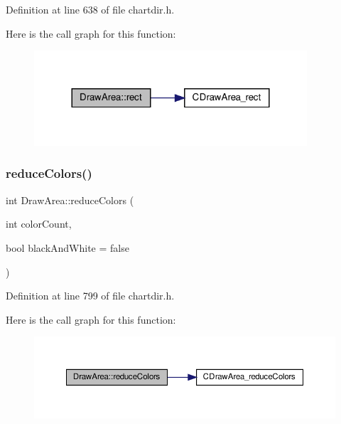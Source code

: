 Definition at line 638 of file chartdir.\+h.

Here is the call graph for this function\+:
\nopagebreak
\begin{figure}[H]
\begin{center}
\leavevmode
\includegraphics[width=288pt]{class_draw_area_ac2ec55572e83f653e1e62a90b222913d_cgraph}
\end{center}
\end{figure}
\mbox{\label{class_draw_area_a129baa2a68bafd5dfe28e7675ffe3890}} 
\subsubsection{\texorpdfstring{reduce\+Colors()}{reduceColors()}}
{\footnotesize\ttfamily int Draw\+Area\+::reduce\+Colors (\begin{DoxyParamCaption}\item[{int}]{color\+Count,  }\item[{bool}]{black\+And\+White = {\ttfamily false} }\end{DoxyParamCaption})\hspace{0.3cm}{\ttfamily [inline]}}



Definition at line 799 of file chartdir.\+h.

Here is the call graph for this function\+:
\nopagebreak
\begin{figure}[H]
\begin{center}
\leavevmode
\includegraphics[width=350pt]{class_draw_area_a129baa2a68bafd5dfe28e7675ffe3890_cgraph}
\end{center}
\end{figure}
\mbox{\label{class_draw_area_ae5d7c28f828147c3c444676139010b00}} 
